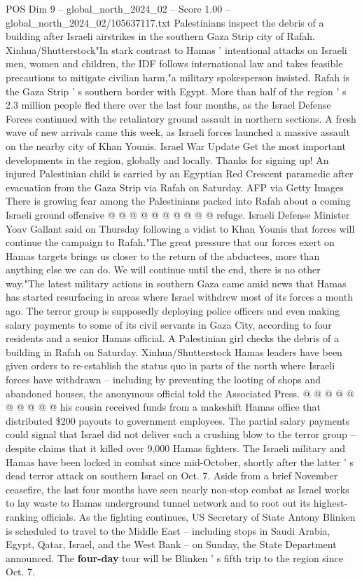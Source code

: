 \begin{textsample}{POS Dim 9 – global\_north\_2024\_02 – Score 1.00 – global\_north\_2024\_02/105637117.txt}  \label{ex:f9_pos_214}
Palestinians inspect the debris of a building after Israeli airstrikes in the southern Gaza Strip city of Rafah.
Xinhua/Shutterstock"In stark contrast to Hamas ' intentional attacks on Israeli men, women and children, the IDF follows international law and takes feasible precautions to mitigate civilian harm,"a military spokesperson insisted.
Rafah is the Gaza Strip ' s southern border with Egypt.
More than half of the region ' s 2.3 million people fled there over the last four months, as the Israel Defense Forces continued with the retaliatory ground assault in northern sections.
A fresh wave of new arrivals came this week, as Israeli forces launched a massive assault on the nearby city of Khan Younis.
Israel War Update Get the most important developments in the region, globally and locally.
Thanks for signing up!
An injured Palestinian child is carried by an Egyptian Red Crescent paramedic after evacuation from the Gaza Strip via Rafah on Saturday.
AFP via Getty Images There is growing fear among the Palestinians packed into Rafah about a coming Israeli ground offensive @ @ @ @ @ @ @ @ @ @ refuge.
Israeli Defense Minister Yoav Gallant said on Thursday following a vidist to Khan Younis that forces will continue the campaign to Rafah."The great pressure that our forces exert on Hamas targets brings us closer to the return of the abductees, more than anything else we can do.
We will continue until the end, there is no other way."The latest military actions in southern Gaza came amid news that Hamas has started resurfacing in areas where Israel withdrew most of its forces a month ago.
The terror group is supposedly deploying police officers and even making salary payments to some of its civil servants in Gaza City, according to four residents and a senior Hamas official.
A Palestinian girl checks the debris of a building in Rafah on Saturday.
Xinhua/Shutterstock Hamas leaders have been given orders to re-establish the status quo in parts of the north where Israeli forces have withdrawn -- including by preventing the looting of shops and abandoned houses, the anonymous official told the Associated Press. @ @ @ @ @ @ @ @ @ @ his cousin received funds from a makeshift Hamas office that distributed \$200 payouts to government employees.
The partial salary payments could signal that Israel did not deliver such a crushing blow to the terror group -- despite claims that it killed over 9,000 Hamas fighters.
The Israeli military and Hamas have been locked in combat since mid-October, shortly after the latter ' s dead terror attack on southern Israel on Oct. 7.
Aside from a brief November ceasefire, the last four months have seen nearly non-stop combat as Israel works to lay waste to Hamas underground tunnel network and to root out its highest-ranking officials.
As the fighting continues, US Secretary of State Antony Blinken is scheduled to travel to the Middle East -- including stops in Saudi Arabia, Egypt, Qatar, Israel, and the West Bank -- on Sunday, the State Department announced.
The \textbf{four-day} tour will be Blinken ' s fifth trip to the region since Oct. 7.

\end{textsample}
